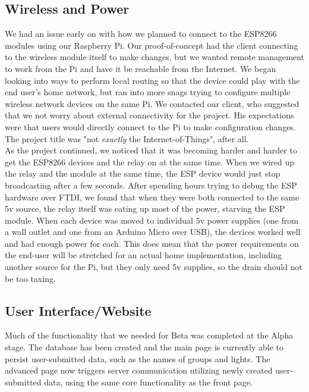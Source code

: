 \documentclass[10pt,draftclsnofoot,onecolumn]{IEEEtran}
\begin{document}
\subsection{Wireless and Power}

We had an issue early on with how we planned to connect to the ESP8266 modules
using our Raspberry Pi. Our proof-of-concept had the client connecting to the
wireless module itself to make changes, but we wanted remote management to work
from the Pi and have it be reachable from the Internet. We began looking into
ways to perform local routing so that the device could play with the end user's
home network, but ran into more snags trying to configure multiple wireless
network devices on the same Pi. We contacted our client, who suggested that we
not worry about external connectivity for the project. His expectations were
that users would directly connect to the Pi to make configuration changes. The
project title was "not \textit{exactly} the Internet-of-Things", after all.\\

As the project continued, we noticed that it was becoming harder and harder to 
get the ESP8266 devices and the relay on at the same time. When we wired up the 
relay and the module at the same time, the ESP device would just stop broadcasting 
after a few seconds. After spending hours trying to debug the ESP hardware over
FTDI, we found that when they were both connected to the same 5v source, the 
relay itself was eating up most of the power, starving the ESP module. When each device
was moved to individual 5v power supplies (one from a wall outlet and one from an
Arduino Micro over USB), the devices worked well and had enough power for each.
This does mean that the power requirements on the end-user will be stretched for an
actual home implementation, including another source for the Pi, but they
only need 5v supplies, so the drain should not be too taxing.
\subsection{User Interface/Website}

Much of the functionality that we needed for Beta was completed at the Alpha stage.
The database has been created and the main page is currently able to persist
user-submitted data, such as the names of groups and lights.  The advanced page
now triggers server communication utilizing newly created
user-submitted data, using the same core functionality as the front page.
\end{document}
